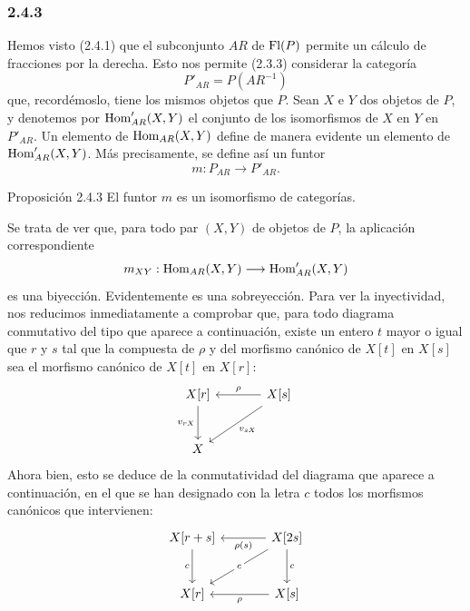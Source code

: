 \subsubsection*{2.4.3}
Hemos visto (2.4.1) que el subconjunto $AR$ de $\operatorname{Fl}(P)$ permite un cálculo de fracciones por la derecha. Esto nos permite (2.3.3) considerar la categoría
\[
P'_{AR}=P(AR^{-1})
\]
que, recordémoslo, tiene los mismos objetos que $P$. Sean $X$ e $Y$ dos objetos de $P$, y denotemos por $\operatorname{Hom}'_{AR}(X,Y)$ el conjunto de los isomorfismos de $X$ en $Y$ en $P'_{AR}$. Un elemento de $\operatorname{Hom}_{AR}(X,Y)$ define de manera evidente un elemento de $\operatorname{Hom}'_{AR}(X,Y)$. Más precisamente, se define así un funtor
\[
m:P_{AR}\longrightarrow P'_{AR}.
\]

\begin{statement}{Proposición 2.4.3}
El funtor $m$ es un isomorfismo de categorías.
\end{statement}

\begin{prooftext}[Demostración]
Se trata de ver que, para todo par $(X,Y)$ de objetos de $P$, la aplicación correspondiente
\[
m_{XY}:\operatorname{Hom}_{AR}(X,Y)\longrightarrow\operatorname{Hom}'_{AR}(X,Y)
\]
es una biyección. Evidentemente es una sobreyección. Para ver la inyectividad, nos reducimos inmediatamente a comprobar que, para todo diagrama conmutativo del tipo que aparece a continuación, existe un entero $t$ mayor o igual que $r$ y $s$ tal que la compuesta de $\rho$ y del morfismo canónico de $X[t]$ en $X[s]$ sea el morfismo canónico de $X[t]$ en $X[r]$:
\[
\begin{tikzcd}[column sep=large,row sep=large]
X[r] \arrow[d,"{v_{rX}}"'] & X[s] \arrow[l,"\rho"'] \arrow[dl,"{v_{sX}}"]\\
X & {}
\end{tikzcd}
\]
Ahora bien, esto se deduce de la conmutatividad del diagrama que aparece a continuación, en el que se han designado con la letra $c$ todos los morfismos canónicos que intervienen:
\[
\begin{tikzcd}[column sep=large,row sep=large]
X[r+s] \arrow[d,"c"'] & X[2s] \arrow[l,"\rho(s)"] \arrow[d,"c"] \arrow[dl,"c" description]\\
X[r] & X[s] \arrow[l,"\rho"]
\end{tikzcd}
\]
\end{prooftext}
